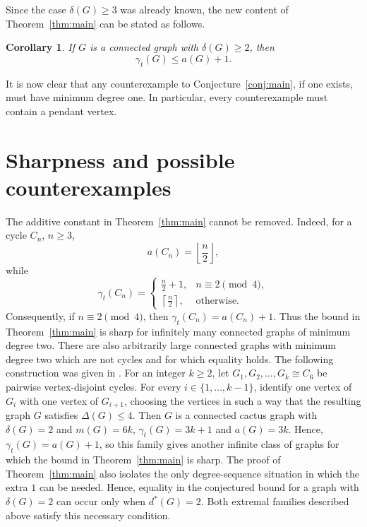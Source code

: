 \documentclass[12pt]{article}
\newtheorem{corollary}[theorem]{Corollary}
\begin{document}
Since the case $\delta(G)\ge 3$ was already known, the new content of Theorem~\ref{thm:main} can be stated as follows.

\begin{corollary}\label{cor:delta2}
If $G$ is a connected graph with $\delta(G) \ge 2$, then
$$\gamma_t(G)\le a(G)+1.$$
\end{corollary}

\medskip

It is now clear that any counterexample to Conjecture~\ref{conj:main}, if one exists, must have minimum degree one. In particular, every counterexample must contain a pendant vertex.


\section{Sharpness and possible counterexamples}\label{sec:remarks}

The additive constant in Theorem~\ref{thm:main} cannot be removed. Indeed, for a cycle $C_n$, $n \ge 3$,
$$a(C_n)=\left\lfloor\frac{n}{2}\right\rfloor,$$
while
$$\gamma_t(C_n)=
\begin{cases}
 \frac{n}{2}+1, & n\equiv2\pmod4,\\[1mm]
 \left\lceil\frac{n}{2}\right\rceil, & \text{otherwise}.
 \end{cases}
$$
Consequently, if $n\equiv2\pmod4$, then $\gamma_t(C_n)=a(C_n)+1$. Thus the bound in Theorem~\ref{thm:main} is sharp for infinitely many connected graphs of minimum degree two. There are also arbitrarily large connected graphs with minimum degree two which are not cycles and for which equality holds. The following construction was given in \cite{BujtasJakovac2019}. For an integer $k\ge 2$, let $G_1,G_2,\ldots,G_k\cong C_6$ be pairwise vertex-disjoint cycles. For every $i\in\{1,\ldots,k-1\}$, identify one vertex of $G_i$ with one vertex of $G_{i+1}$, choosing the vertices in such a way that the resulting graph $G$ satisfies $\Delta(G)\le 4$. Then $G$ is a connected cactus graph with $\delta(G)=2$ and $m(G)=6k$, $\gamma_t(G)=3k+1$ and $a(G)=3k$. Hence, $\gamma_t(G)=a(G)+1$, so this family gives another infinite class of graphs for which the bound in Theorem~\ref{thm:main} is sharp. The proof of Theorem~\ref{thm:main} also isolates the only degree-sequence situation in which the extra $1$ can be needed. Hence, equality in the conjectured bound for a graph with $\delta(G)=2$ can occur only when $d^*(G)=2$. Both extremal families described above satisfy this necessary condition.
\end{document}
